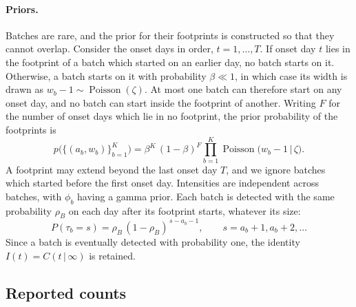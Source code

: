 \documentclass[11pt,a4paper]{article}
\newcommand{\given}{\,|\,}
\newcommand{\pois}{\operatorname{Poisson}}
\begin{document}
\paragraph{Priors.} Batches are rare, and the prior for their footprints is
constructed so that they cannot overlap. Consider the onset days in order,
$t=1,\dots,T$. If onset day $t$ lies in the footprint of a batch which started
on an earlier day, no batch starts on it. Otherwise, a batch starts on it with
probability $\beta\ll 1$, in which case its width is drawn as
$w_b-1\sim\pois(\zeta)$. At most one batch can therefore start on any onset
day, and no batch can start inside the footprint of another. Writing $F$ for
the number of onset days which lie in no footprint, the prior probability of
the footprints is
\begin{equation}\label{eq:footprintprior}
p\bigl(\{(a_b,w_b)\}_{b=1}^{K}\bigr)
= \beta^{K}\,(1-\beta)^{F}\prod_{b=1}^{K}\pois\bigl(w_b-1\given\zeta\bigr).
\end{equation}
A footprint may extend beyond the last onset day $T$, and we ignore batches
which started before the first onset day. Intensities are independent across
batches, with $\phi_b$ having a gamma prior. Each batch is
detected with the same probability $\rho_B$ on each day after its footprint
starts, whatever its size:
\begin{equation}\label{eq:detection}
P(\tau_b=s) = \rho_B\,(1-\rho_B)^{\,s-a_b-1},\qquad s=a_b+1,a_b+2,\dots
\end{equation}
Since a batch is eventually detected with probability one, the identity
$I(t)=C(t\given\infty)$ is retained.

\subsection{Reported counts}
\end{document}

